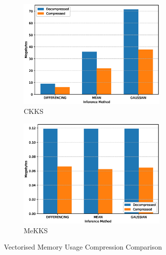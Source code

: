 \begin{figure}[h!]
    \centering
    \begin{subfigure}[b]{0.495\textwidth}
        \centering
        \includegraphics[width=0.8\textwidth]{figures/memUsageCKKS}
        \caption{CKKS}
    \end{subfigure}
    \hfill
    \begin{subfigure}[b]{0.495\textwidth}
        \centering
        \includegraphics[width=0.8\textwidth]{figures/memUsageMeKKS}
        \caption{MeKKS}
    \end{subfigure}
    \caption{Vectorised Memory Usage Compression Comparison}
    \label{fig:compression2}
\end{figure}
